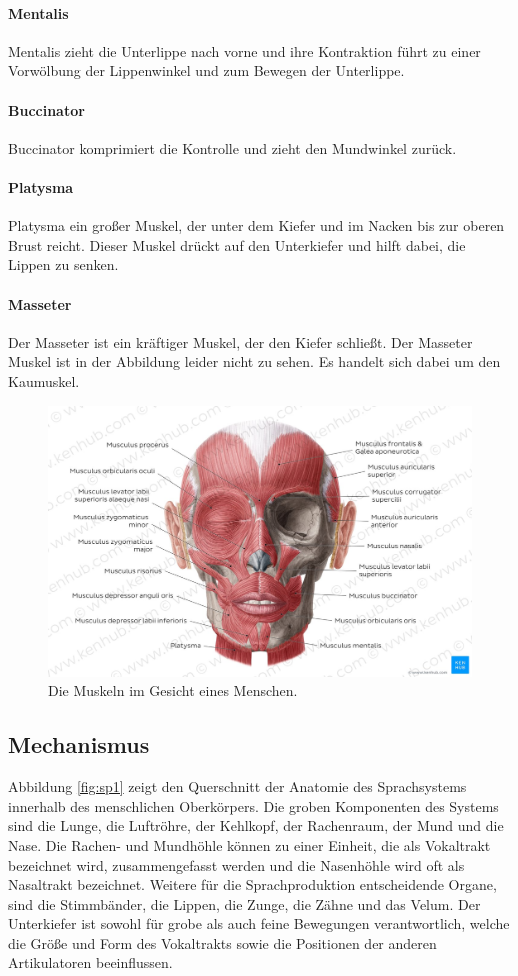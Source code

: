 \paragraph{Mentalis}
Mentalis zieht die Unterlippe nach vorne und ihre Kontraktion führt zu einer Vorwölbung der Lippenwinkel und zum Bewegen der Unterlippe.
\paragraph{Buccinator}
Buccinator komprimiert die Kontrolle und zieht den Mundwinkel zurück.
\paragraph{Platysma}
Platysma ein großer Muskel, der unter dem Kiefer und im Nacken bis zur oberen Brust reicht. Dieser Muskel drückt auf den Unterkiefer und hilft dabei, die Lippen zu senken.
\paragraph{Masseter}
Der Masseter ist ein kräftiger Muskel, der den Kiefer schließt. Der Masseter Muskel ist in der Abbildung leider nicht zu sehen. Es handelt sich dabei um den Kaumuskel.

\begin{figure}[H]
  \centering
  \includegraphics[width=\linewidth]{FaceMuscle.png}
  \caption{Die Muskeln im Gesicht eines Menschen.  \cite{kenhub}}
  \label{fig:FaceMusc}
\end{figure}


\subsection{Mechanismus}
Abbildung \ref{fig:sp1} zeigt den Querschnitt der Anatomie des Sprachsystems innerhalb des menschlichen Oberkörpers. Die groben Komponenten des Systems sind die Lunge, die Luftröhre, der Kehlkopf, der Rachenraum, der Mund und die Nase. Die Rachen- und Mundhöhle können zu einer Einheit, die als Vokaltrakt bezeichnet wird, zusammengefasst werden und die Nasenhöhle wird oft als Nasaltrakt bezeichnet.
Weitere für die Sprachproduktion entscheidende Organe, sind die Stimmbänder, die Lippen, die Zunge, die Zähne und das Velum.
Der Unterkiefer ist sowohl für grobe als auch feine Bewegungen verantwortlich, welche die Größe und Form des Vokaltrakts sowie die Positionen der anderen Artikulatoren beeinflussen. \cite{Docio-Fernandez2015}

